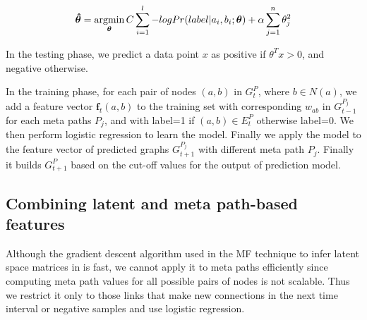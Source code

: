 
\begin{equation}
\boldsymbol{\hat{\theta}} = 
\operatorname*{argmin}\limits_{\boldsymbol{\theta}}C\sum_{i=1}^l -log Pr(label |a_i, b_i; \boldsymbol{\theta}) + \alpha \sum_{j=1}^n \theta_j^2
\end{equation}
  
In the testing phase, we predict a data point $x$ as positive if $\theta^Tx > 0$, and negative otherwise.




In the training phase, for each pair of nodes $(a,b)$ in $G^{P}_{t}$, where $b \in N(a)$, we add a feature vector $\boldsymbol{f}_t(a,b)$ to the training set with corresponding $w_{ab}$ in $G^{P_j}_{t-1}$ for each meta paths $P_j$, and with label=1 if $(a,b) \in E^{P}_{t}$ otherwise label=0. We then perform logistic regression to learn the model. Finally we apply the model to the feature vector of predicted graphs $G^{P_j}_{t+1}$ with different meta path $P_j$. Finally it builds $G^{P}_{t+1}$ based on the cut-off values for the output of prediction model.


\subsection{Combining latent and meta path-based features}



Although the gradient descent algorithm used in the MF technique to infer latent space matrices in \cite{Zhu2016} is fast, we cannot apply it to meta paths efficiently since computing meta path values for all possible pairs of nodes is not scalable. Thus we restrict it only to those links that make new connections in the next time interval or negative samples and use logistic regression. 


